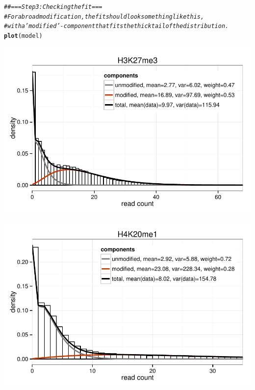 \documentclass[11pt]{article}\usepackage[]{graphicx}\usepackage[]{color}
\makeatletter
\def\maxwidth{ %
  \ifdim\Gin@nat@width>\linewidth
    \linewidth
  \else
    \Gin@nat@width
  \fi
}
\newcommand{\hlcom}[1]{\textcolor[rgb]{0.678,0.584,0.686}{\textit{#1}}}%
\newcommand{\hlstd}[1]{\textcolor[rgb]{0.345,0.345,0.345}{#1}}%
\newcommand{\hlkwd}[1]{\textcolor[rgb]{0.737,0.353,0.396}{\textbf{#1}}}%
\newenvironment{kframe}{%
 \def\at@end@of@kframe{}%
 \ifinner\ifhmode%
  \def\at@end@of@kframe{\end{minipage}}%
  \begin{minipage}{\columnwidth}%
 \fi\fi%
 \def\FrameCommand##1{\hskip\@totalleftmargin \hskip-\fboxsep
 \colorbox{shadecolor}{##1}\hskip-\fboxsep
     \hskip-\linewidth \hskip-\@totalleftmargin \hskip\columnwidth}%
 \MakeFramed {\advance\hsize-\width
   \@totalleftmargin\z@ \linewidth\hsize
   \@setminipage}}%
 {\par\unskip\endMakeFramed%
 \at@end@of@kframe}
\newenvironment{knitrout}{}{} %
\makeatother
\begin{document}
\begin{scriptsize}
\begin{knitrout}
\color{fgcolor}\begin{kframe}
\begin{alltt}
\hlcom{## === Step 3: Checking the fit ===}
\hlcom{# For a broad modification, the fit should look something like this,}
\hlcom{# with a 'modified'-component that fits the thick tail of the distribution.}
\hlkwd{plot}\hlstd{(model)}
\end{alltt}
\end{kframe}
\includegraphics[width=\maxwidth]{figure/univariate_broad_plotting-1} 

\end{knitrout}

\begin{knitrout}
\color{fgcolor}
\includegraphics[width=\maxwidth]{figure/univariate_broad_H4K20me1-1} 


\end{knitrout}
\end{scriptsize}
\end{document}
